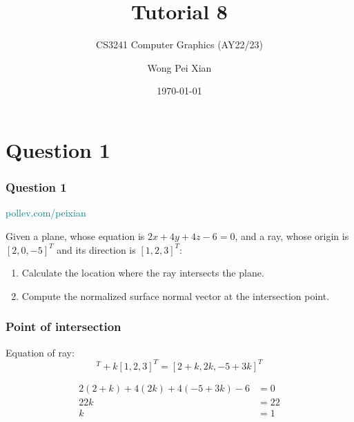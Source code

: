 \documentclass{beamer}
\title{Tutorial 8}
\subtitle{CS3241 Computer Graphics (AY22/23)}
\date{\today}
\author{Wong Pei Xian}
\institute[]{\email{e0389023@u.nus.edu}}
\begin{document}
\frame[plain]{\titlepage}

\section{Question 1}

\begin{frame}
    \frametitle{Question 1}

    \begin{tcolorbox}[colback=teal!5!white]
        \textcolor{teal}{pollev.com/peixian}
    \end{tcolorbox}

    \vspace{1em}
    Given a plane, whose equation is $2x + 4y + 4z - 6 = 0$, 
    and a ray, whose origin is $[2, 0, -5]^T$ and its direction is $[1, 2, 3]^T$:

    \begin{enumerate}
        \item Calculate the location where the ray intersects the plane.
        \item Compute the normalized surface normal vector at the intersection point.
    \end{enumerate}

\end{frame}

\begin{frame}
    \frametitle{Point of intersection}

    \begin{tcolorbox}
        Equation of ray: \\
        \begin{equation*}
            [2, 0, -5]^T + k[1, 2, 3]^T = [2 + k, 2k, -5 +3k]^T
        \end{equation*}
    \end{tcolorbox}

    \begin{eqnarray*}
        2(2 + k) + 4(2k) + 4(-5 + 3k) - 6 &= 0\\
        22k &= 22\\
        k &= 1\\
    \end{eqnarray*}

\end{frame}
\end{document}
